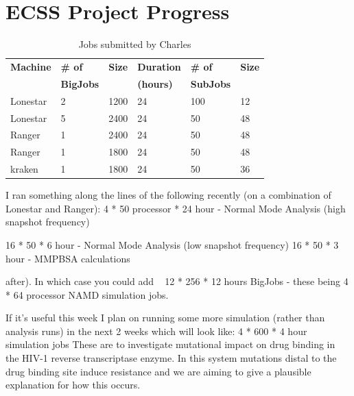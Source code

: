 \documentclass{sig-alternate}
\begin{document}
\section{ECSS Project Progress}



\begin{table}[h]
\begin{center}
\begin{tabular}{p{1.1cm}p{1.2cm}p{0.8cm}p{1.2cm}p{1.1cm}p{0.8cm}}
\toprule
\textbf{Machine}  & 
\textbf{\# of}    &
\textbf{Size}     & 
\textbf{Duration} & 
\textbf{\# of}    &
\textbf{Size}     \\
                  &
\textbf{BigJobs}  &
                  &
\textbf{(hours)}  &
\textbf{SubJobs}  &
                  \\ \midrule
Lonestar & 2 & 1200 & 24 & 100 & 12 \\ \midrule
Lonestar & 5 & 2400 & 24 &  50 & 48 \\ \midrule
Ranger   & 1 & 2400 & 24 &  50 & 48 \\ \midrule
Ranger   & 1 & 1800 & 24 &  50 & 48 \\ \midrule
kraken   & 1 & 1800 & 24 &  50 & 36 \\ \bottomrule
\end{tabular}
\caption{Jobs submitted by Charles}
\label{table:results}
\end{center}
\end{table}




I ran something along the lines of the following recently (on a combination of Lonestar and Ranger):
4 * 50 processor * 24 hour - Normal Mode Analysis (high snapshot frequency)

16 * 50 * 6 hour - Normal Mode Analysis (low snapshot frequency)
16 * 50 * 3 hour - MMPBSA calculations

after). In which case you could add ~ 12 * 256 * 12 hours BigJobs - these being 4 * 64 processor NAMD simulation jobs.

If it's useful this week I plan on running some more simulation (rather than analysis runs) in the next 2 weeks which will look like:
4 * 600 * 4 hour simulation jobs
These are to investigate mutational impact on drug binding in the HIV-1 reverse transcriptase enzyme. In this system mutations distal to the drug binding site induce resistance and we are aiming to give a plausible explanation for how this occurs.
\end{document}
